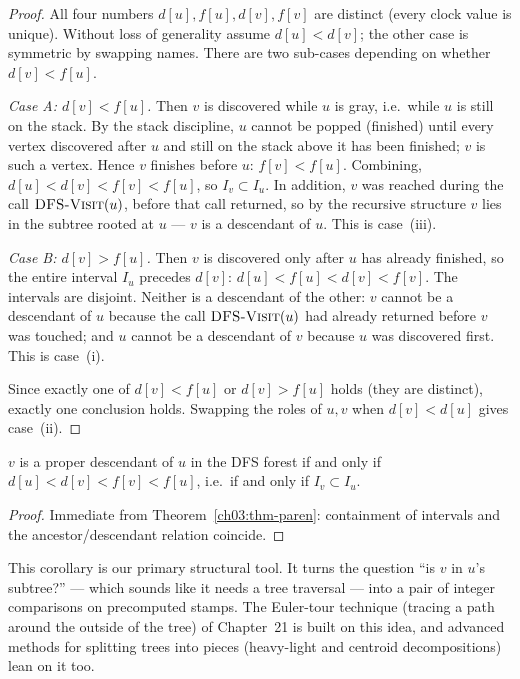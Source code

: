 \begin{proof}
All four numbers $d[u],f[u],d[v],f[v]$ are distinct (every clock value is unique). Without loss of generality assume $d[u]<d[v]$; the other case is symmetric by swapping names. There are two sub-cases depending on whether $d[v]<f[u]$.

\emph{Case A: $d[v]<f[u]$.} Then $v$ is discovered while $u$ is gray, i.e.\ while $u$ is still on the stack. By the stack discipline, $u$ cannot be popped (finished) until every vertex discovered after $u$ and still on the stack above it has been finished; $v$ is such a vertex. Hence $v$ finishes before $u$: $f[v]<f[u]$. Combining, $d[u]<d[v]<f[v]<f[u]$, so $I_v\subset I_u$. In addition, $v$ was reached during the call $\textsc{DFS-Visit}(u)$, before that call returned, so by the recursive structure $v$ lies in the subtree rooted at $u$ --- $v$ is a descendant of $u$. This is case~(iii).

\emph{Case B: $d[v]>f[u]$.} Then $v$ is discovered only after $u$ has already finished, so the entire interval $I_u$ precedes $d[v]$: $d[u]<f[u]<d[v]<f[v]$. The intervals are disjoint. Neither is a descendant of the other: $v$ cannot be a descendant of $u$ because the call $\textsc{DFS-Visit}(u)$ had already returned before $v$ was touched; and $u$ cannot be a descendant of $v$ because $u$ was discovered first. This is case~(i).

Since exactly one of $d[v]<f[u]$ or $d[v]>f[u]$ holds (they are distinct), exactly one conclusion holds. Swapping the roles of $u,v$ when $d[v]<d[u]$ gives case~(ii).
\end{proof}

\begin{corollary}\label{ch03:cor-nest}
$v$ is a proper descendant of $u$ in the DFS forest if and only if $d[u]<d[v]<f[v]<f[u]$, i.e.\ if and only if $I_v\subset I_u$.
\end{corollary}

\begin{proof}
Immediate from Theorem~\ref{ch03:thm-paren}: containment of intervals and the ancestor/descendant relation coincide.
\end{proof}

This corollary is our primary structural tool. It turns the question ``is $v$ in $u$'s subtree?'' --- which sounds like it needs a tree traversal --- into a pair of integer comparisons on precomputed stamps. The Euler-tour technique (tracing a path around the outside of the tree) of Chapter~21 is built on this idea, and advanced methods for splitting trees into pieces (heavy-light and centroid decompositions) lean on it too.

